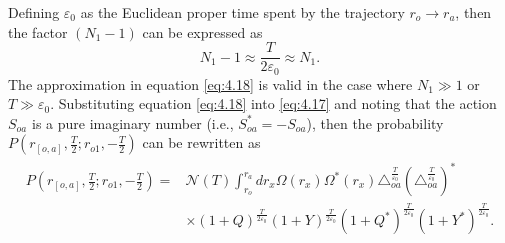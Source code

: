 \documentclass[12pt]{article}
\begin{document}
Defining $\varepsilon_{0}$ as the Euclidean proper time spent by the trajectory $r_{o}\rightarrow r_{a}$, then the factor $(N_{1}-1)$ can be expressed as
\begin{equation}
\label{eq:4.18}%
N_{1}-1\approx \frac{T}{2\varepsilon_{0}}\approx N_{1}.
\end{equation}
The approximation in equation \eqref{eq:4.18} is valid in the case where $N_{1}\gg1$ or $T\gg \varepsilon_{0}$.  Substituting equation \eqref{eq:4.18} into \eqref{eq:4.17} and noting that the action $S_{oa}$ is a pure imaginary number (i.e., $S_{oa}^{*}=-S_{oa}$), then the probability $P(r_{[o,a]},\frac{T}{2}; r_{o1}, -\frac{T}{2})$ can be rewritten as
\begin{eqnarray}\begin{split}
\label{eq:4.19}%
P(r_{[o,a]},\frac{T}{2}; r_{o1}, -\frac{T}{2})=&\mathscr{N}(T)\int_{r_{o}}^{r_{a}}dr_{x}\Omega(r_{x})\Omega^{*}(r_{x})\triangle_{oa}^{\frac{T}{\varepsilon_{0}}}(\triangle_{oa}^{\frac{T}{\varepsilon_{0}}})^{*}\\&\times
(1+Q)^{\frac{T}{2\varepsilon_{0}}}(1+Y)^{\frac{T}{2\varepsilon_{0}}}(1+Q^{*})^{\frac{T}{2\varepsilon_{0}}}(1+Y^{*})^{\frac{T}{2\varepsilon_{0}}}.
\end{split}
\end{eqnarray}
\end{document}
